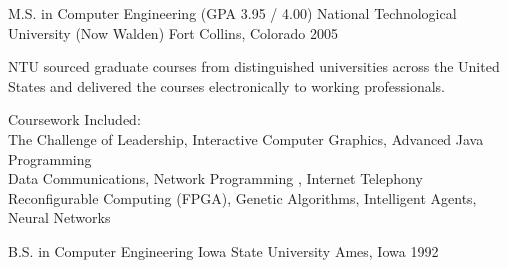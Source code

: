 

\begin{cventries}

  \cventry
    {M.S. in Computer Engineering  (GPA 3.95 / 4.00) } %
    {National Technological University (Now Walden)} %
    {Fort Collins, Colorado} %
    {2005} %
    {
      \begin{cvitems} %
        \item { NTU sourced graduate courses from distinguished universities
                across the United States and delivered the courses electronically
                to working professionals.}
        \item {
            Coursework Included: \\
            The Challenge of Leadership, Interactive Computer Graphics, Advanced Java Programming \\
          Data Communications, Network Programming , Internet Telephony \\
          Reconfigurable Computing (FPGA), Genetic Algorithms, Intelligent Agents, Neural Networks
        }
      \end{cvitems}
    }
  \cventry
    {B.S. in Computer Engineering} %
    {Iowa State University} %
    {Ames, Iowa} %
    {1992} %
    {
      \begin{cvitems} %
      \end{cvitems}
    }

\end{cventries}
